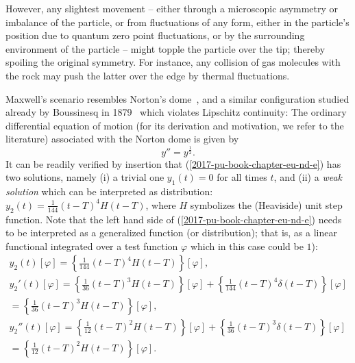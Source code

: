 However, any slightest movement -- either through a microscopic asymmetry or imbalance of the particle,
or from fluctuations of any form, either in the particle's position due to quantum zero point fluctuations,
or by the surrounding environment of the particle --  might topple the particle over the tip;
thereby spoiling the original symmetry.
For instance, any collision of gas molecules with the rock may push the latter over the edge
by thermal fluctuations.


Maxwell's scenario resembles
Norton's dome~\cite{Norton-dome-2008,Malament-2008,Laraudogoitia2013,Fletcher2012,Werndl-DeterminismandIndeterminism},
and a similar configuration studied already by Boussinesq in 1879~\cite[pp.~176-178]{vanStrien2014}
which violates Lipschitz continuity:
The ordinary differential equation of motion
(for its derivation and motivation, we refer to the literature)
associated with the Norton dome is given by
\begin{equation}
y'' =y^\frac{1}{2}.
\label{2017-pu-book-chapter-eu-nd-e}
\end{equation}
It can be readily verified by insertion that (\ref{2017-pu-book-chapter-eu-nd-e})
has two solutions, namely (i) a trivial one
$y_1(t)=0$ for all times $t$, and (ii) a {\em weak solution}
 which can be interpreted as distribution:
$y_2(t)= \frac{1}{144} (t-T)^4  H (t-T)$, where $H$ symbolizes the (Heaviside) unit step function.
Note that the left hand side of (\ref{2017-pu-book-chapter-eu-nd-e})
needs to be interpreted as a generalized function (or distribution);
that is, as a linear functional integrated over a test function $\varphi$ which in this case could be $1$):
\begin{equation}
\begin{split}
y_2(t)[\varphi]= \left\{ \frac{1}{144} (t-T)^4  H (t-T) \right\}[\varphi],\\
y_2'(t)[\varphi]=
\left\{ \frac{1}{36}  (t-T)^3  H (t-T) \right\}[\varphi]
 +
\left\{ \frac{1}{144} (t-T)^4  \delta (t-T) \right\}[\varphi]  \\
=
\left\{ \frac{1}{36}  (t-T)^3  H (t-T) \right\}[\varphi],
\\
y_2''(t)[\varphi]
=
\left\{ \frac{1}{12}  (t-T)^2  H (t-T) \right\}[\varphi]
+
\left\{ \frac{1}{36}   (t-T)^3  \delta (t-T) \right\}[\varphi] \\
=
\left\{ \frac{1}{12}  (t-T)^2  H (t-T) \right\}[\varphi].
\end{split}
\end{equation}

